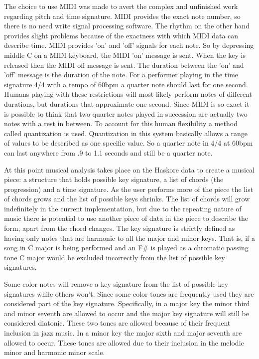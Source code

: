 \documentclass[12pt]{ucthesis}
\begin{document}
{The choice to use MIDI was made to avert the complex and unfinished work regarding pitch and time signature. MIDI provides the exact note number, so there is no need write signal processing software. The rhythm on the other hand provides slight problems because of the exactness with which MIDI data can describe time. MIDI provides 'on' and 'off' signals for each note. So by depressing middle C on a MIDI keyboard, the MIDI 'on' message is sent. When the key is released then the MIDI off message is sent. The duration between the 'on' and 'off' message is the duration of the note. For a performer playing in the time signature 4/4 with a tempo of 60bpm a quarter note should last for one second. Humans playing with these restrictions will most likely perform notes of different durations, but durations that approximate one second. Since MIDI is so exact it is possible to think that two quarter notes played in succession are actually two notes with a rest in between. To account for this human flexibility a method called quantization is used. Quantization in this system basically allows a range of values to be described as one specific value. So a quarter note in 4/4 at 60bpm can last anywhere from .9 to 1.1 seconds and still be a quarter note. 

At this point musical analysis takes place on the Haskore data to create a musical piece: a structure that holds possible key signature, a list of chords (the progression) and a time signature. As the user performs more of the piece the list of chords grows and the list of possible keys shrinks. The list of chords will grow indefinitely in the current implementation, but due to the repeating nature of music there is potential to use another piece of data in the piece to describe the form, apart from the chord changes. The key signature is strictly defined as having only notes that are harmonic to all the major and minor keys. That is, if a song in C major is being performed and an F\# is played as a chromatic passing tone C major would be excluded incorrectly from the list of possible key signatures. 

Some color notes will remove a key signature from the list of possible key signatures while others won't. Since some color tones are frequently used they are considered part of the key signature.  Specifically, in a major key the minor third and minor seventh are allowed to occur and the major key signature will still be considered diatonic. These two tones are allowed because of their frequent inclusion in jazz music. In a minor key the major sixth and major seventh are allowed to occur. These tones are allowed due to their inclusion in the melodic minor and harmonic minor scale. 

}
\end{document}
